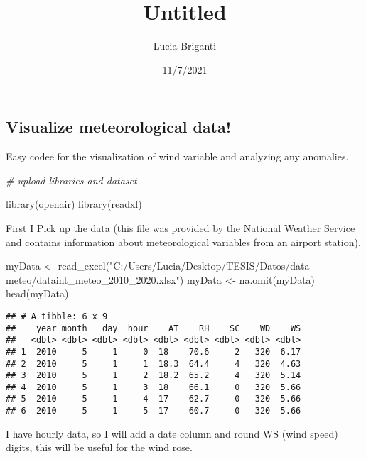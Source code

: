 \documentclass[
]{article}
\title{Untitled}
\author{Lucia Briganti}
\date{11/7/2021}
\newenvironment{Shaded}{\begin{snugshade}}{\end{snugshade}}
\newcommand{\CommentTok}[1]{\textcolor[rgb]{0.56,0.35,0.01}{\textit{#1}}}
\newcommand{\FunctionTok}[1]{\textcolor[rgb]{0.00,0.00,0.00}{#1}}
\newcommand{\NormalTok}[1]{#1}
\newcommand{\OtherTok}[1]{\textcolor[rgb]{0.56,0.35,0.01}{#1}}
\newcommand{\StringTok}[1]{\textcolor[rgb]{0.31,0.60,0.02}{#1}}
\begin{document}
\maketitle

\hypertarget{visualize-meteorological-data}{%
\subsection{Visualize meteorological
data!}\label{visualize-meteorological-data}}

Easy codee for the visualization of wind variable and analyzing any
anomalies.

\begin{Shaded}
\begin{Highlighting}[]
\CommentTok{\# upload libraries and dataset}

\FunctionTok{library}\NormalTok{(openair)}
\FunctionTok{library}\NormalTok{(readxl)}
\end{Highlighting}
\end{Shaded}

First I Pick up the data (this file was provided by the National Weather
Service and contains information about meteorological variables from an
airport station).

\begin{Shaded}
\begin{Highlighting}[]
\NormalTok{myData }\OtherTok{\textless{}{-}} \FunctionTok{read\_excel}\NormalTok{(}\StringTok{"C:/Users/Lucia/Desktop/TESIS/Datos/data meteo/dataint\_meteo\_2010\_2020.xlsx"}\NormalTok{)}
\NormalTok{myData }\OtherTok{\textless{}{-}} \FunctionTok{na.omit}\NormalTok{(myData)}
\FunctionTok{head}\NormalTok{(myData)}
\end{Highlighting}
\end{Shaded}

\begin{verbatim}
## # A tibble: 6 x 9
##    year month   day  hour    AT    RH    SC    WD    WS
##   <dbl> <dbl> <dbl> <dbl> <dbl> <dbl> <dbl> <dbl> <dbl>
## 1  2010     5     1     0  18    70.6     2   320  6.17
## 2  2010     5     1     1  18.3  64.4     4   320  4.63
## 3  2010     5     1     2  18.2  65.2     4   320  5.14
## 4  2010     5     1     3  18    66.1     0   320  5.66
## 5  2010     5     1     4  17    62.7     0   320  5.66
## 6  2010     5     1     5  17    60.7     0   320  5.66
\end{verbatim}

I have hourly data, so I will add a date column and round WS (wind
speed) digits, this will be useful for the wind rose.
\end{document}
